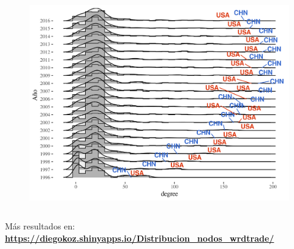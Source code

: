 \documentclass[compress]{beamer}
\begin{document}
\begin{frame}
\begin{columns}[c]
\begin{flushleft}
\begin{figure}
\includegraphics[scale=0.35]{impo_densidad_USAvsCHN_grado_x_yr}
\end{figure}
\end{flushleft}

\end{columns}
\small{Más resultados en: \textbf{\url{https://diegokoz.shinyapps.io/Distribucion_nodos_wrdtrade/}}}
\end{frame}
\end{document}
